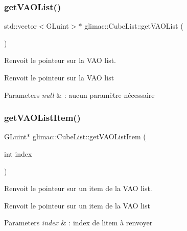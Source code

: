 \subsubsection{\texorpdfstring{get\+V\+A\+O\+List()}{getVAOList()}}
{\footnotesize\ttfamily std\+::vector$<$G\+Luint$>$$\ast$ glimac\+::\+Cube\+List\+::get\+V\+A\+O\+List (\begin{DoxyParamCaption}{ }\end{DoxyParamCaption})\hspace{0.3cm}{\ttfamily [inline]}}



Renvoit le pointeur sur la V\+AO list. 

Renvoit le pointeur sur la V\+AO list


\begin{DoxyParams}{Parameters}
{\em null} & \+: aucun paramètre nécessaire \\
\hline
\end{DoxyParams}
\mbox{\label{classglimac_1_1CubeList_a46cfba24380b3421086a0ac97ae4e789}} 
\subsubsection{\texorpdfstring{get\+V\+A\+O\+List\+Item()}{getVAOListItem()}}
{\footnotesize\ttfamily G\+Luint$\ast$ glimac\+::\+Cube\+List\+::get\+V\+A\+O\+List\+Item (\begin{DoxyParamCaption}\item[{int}]{index }\end{DoxyParamCaption})\hspace{0.3cm}{\ttfamily [inline]}}



Renvoit le pointeur sur un item de la V\+AO list. 

Renvoit le pointeur sur un item de la V\+AO list


\begin{DoxyParams}{Parameters}
{\em index} & \+: index de l\textquotesingle{}item à renvoyer \\
\hline
\end{DoxyParams}
\mbox{\label{classglimac_1_1CubeList_a82eae5adc714b8f00a23e7ad8d2aee85}} 
